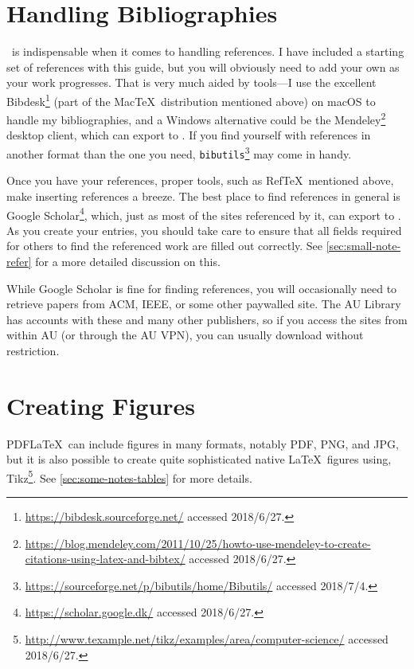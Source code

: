 \section*{Handling Bibliographies}
\label{sec:handl-bibl}

\mBibTeX\ is indispensable when it comes to handling references. I have
included a starting set of references with this guide, but you will
obviously need to add your own as your work progresses.  That is very
much aided by tools---I use the excellent
Bibdesk\footnote{\url{https://bibdesk.sourceforge.net/} accessed
  2018/6/27.} (part of the Mac\negthinspace\TeX\ distribution mentioned above) on
macOS to handle my bibliographies, and a Windows alternative could be
the
Mendeley\footnote{\url{https://blog.mendeley.com/2011/10/25/howto-use-mendeley-to-create-citations-using-latex-and-bibtex/}
  accessed 2018/6/27.}  desktop client, which can export to
\mBibTeX. If you find yourself with references in another format than
the one you need,
\texttt{bibutils}\footnote{\url{https://sourceforge.net/p/bibutils/home/Bibutils/}
  accessed 2018/7/4.} may come in handy.

Once you have your references, proper tools, such as Ref\TeX\
mentioned above, make inserting references a breeze.  The best place
to find references in general is Google
Scholar\footnote{\url{https://scholar.google.dk/} accessed
  2018/6/27.}, which, just as most of the sites referenced by it, can
export to \mBibTeX. As you create your entries, you should take care
to ensure that all fields required for others to find the referenced
work are filled out correctly.  See \autoref{sec:small-note-refer} for
a more detailed discussion on this.

While Google Scholar is fine for finding references, you will
occasionally need to retrieve papers from ACM, IEEE, or some other
paywalled site.  The AU Library has accounts with these and many other
publishers, so if you access the sites from within AU (or through the
AU VPN), you can usually download without restriction.

\section*{Creating Figures}
\label{sec:creating-figures}

PDF\LaTeX\ can include figures in many formats, notably \acs{PDF},
\acs{PNG}, and \acs{JPG}, but it is also possible to create quite
sophisticated native \LaTeX\ figures using, \eg
Tikz\footnote{\url{http://www.texample.net/tikz/examples/area/computer-science/}
  accessed 2018/6/27.}. See \autoref{sec:some-notes-tables} for more
details.

